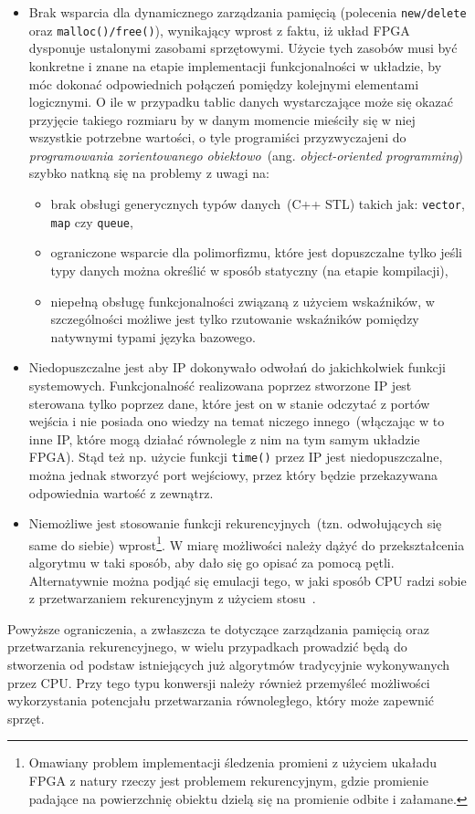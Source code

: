 \begin{itemize}
\item Brak wsparcia dla dynamicznego zarządzania pamięcią (polecenia \texttt{new/delete} oraz \texttt{malloc()/free()}), wynikający wprost z faktu, iż układ FPGA dysponuje ustalonymi zasobami sprzętowymi. Użycie tych zasobów musi być konkretne i znane na etapie implementacji funkcjonalności w układzie, by móc dokonać odpowiednich połączeń pomiędzy kolejnymi elementami logicznymi. O ile w przypadku tablic danych wystarczające może się okazać przyjęcie takiego rozmiaru by w danym momencie mieściły się w niej wszystkie potrzebne wartości, o tyle programiści przyzwyczajeni do \textit{programowania zorientowanego obiektowo}~(ang. \textit{object-oriented programming}) szybko natkną się na problemy z uwagi na:
\begin{itemize}
\item brak obsługi generycznych typów danych~(C++ STL) takich jak: \texttt{vector}, \texttt{map} czy \texttt{queue},
\item ograniczone wsparcie dla polimorfizmu, które jest dopuszczalne tylko jeśli typy danych można określić w sposób statyczny (na etapie kompilacji),
\item niepełną obsługę funkcjonalności związaną z użyciem wskaźników, w szczególności możliwe jest tylko rzutowanie wskaźników pomiędzy natywnymi typami języka bazowego.
\end{itemize}
\item Niedopuszczalne jest aby IP dokonywało odwołań do jakichkolwiek funkcji systemowych. Funkcjonalność realizowana poprzez stworzone IP jest sterowana tylko poprzez dane, które jest on w stanie odczytać z portów wejścia i nie posiada ono wiedzy na temat niczego innego~(włączając w to inne IP, które mogą działać równolegle z nim na tym samym układzie FPGA). Stąd też np. użycie funkcji \texttt{time()} przez IP jest niedopuszczalne, można jednak stworzyć port wejściowy, przez który będzie przekazywana odpowiednia wartość z zewnątrz. 
\item Niemożliwe jest stosowanie funkcji rekurencyjnych~(tzn. odwołujących się same do siebie) wprost\footnote{Omawiany problem implementacji śledzenia promieni z użyciem ukaładu FPGA z natury rzeczy jest problemem rekurencyjnym, gdzie promienie padające na powierzchnię obiektu dzielą się na promienie odbite i załamane.}. W miarę możliwości należy dążyć do przekształcenia algorytmu w taki sposób, aby dało się go opisać za pomocą pętli. Alternatywnie można podjąć się emulacji tego, w jaki sposób CPU radzi sobie z przetwarzaniem rekurencyjnym z użyciem stosu~\cite{HLS_RECURSIVE}.
\end{itemize} 
Powyższe ograniczenia, a zwłaszcza te dotyczące zarządzania pamięcią oraz przetwarzania rekurencyjnego, w wielu przypadkach prowadzić będą do stworzenia od podstaw istniejących już algorytmów tradycyjnie wykonywanych przez CPU. Przy tego typu konwersji należy również przemyśleć możliwości wykorzystania potencjału przetwarzania równoległego, który może zapewnić sprzęt.

